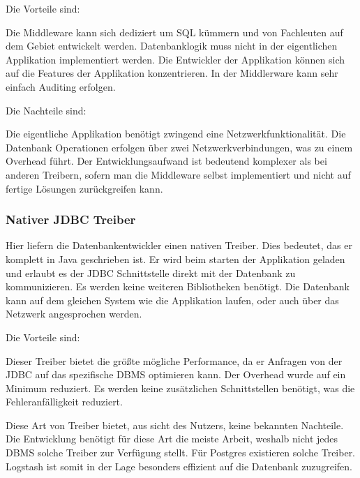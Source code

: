 Die Vorteile sind:

\begin{outline}
  \1 Die Middleware kann sich dediziert um SQL kümmern und von Fachleuten auf
  dem Gebiet entwickelt werden.
  \1 Datenbanklogik muss nicht in der eigentlichen Applikation implementiert
  werden. Die Entwickler der Applikation können sich auf die Features der
  Applikation konzentrieren.
  \1 In der Middlerware kann sehr einfach Auditing erfolgen.
\end{outline}

Die Nachteile sind:

\begin{outline}
  \1 Die eigentliche Applikation benötigt zwingend eine Netzwerkfunktionalität.
  \1 Die Datenbank Operationen erfolgen über zwei Netzwerkverbindungen, was
  zu einem Overhead führt.
  \1 Der Entwicklungsaufwand ist bedeutend komplexer als bei anderen Treibern,
  sofern man die Middleware selbst implementiert und nicht auf fertige Lösungen
  zurückgreifen kann.
\end{outline}

\subsubsection{Nativer JDBC Treiber}
Hier liefern die Datenbankentwickler einen nativen Treiber. Dies bedeutet, das
er komplett in Java geschrieben ist. Er wird beim starten der Applikation
geladen und erlaubt es der JDBC Schnittstelle direkt mit der Datenbank zu
kommunizieren. Es werden keine weiteren Bibliotheken benötigt. Die Datenbank
kann auf dem gleichen System wie die Applikation laufen, oder auch über das
Netzwerk angesprochen werden.

Die Vorteile sind:

\begin{outline}
  \1 Dieser Treiber bietet die größte mögliche Performance, da er Anfragen von
  der JDBC auf das spezifische DBMS optimieren kann.
  \1 Der Overhead wurde auf ein Minimum reduziert.
  \1 Es werden keine zusätzlichen Schnittstellen benötigt, was die
  Fehleranfälligkeit reduziert.
\end{outline}

Diese Art von Treiber bietet, aus sicht des Nutzers, keine bekannten Nachteile.
Die Entwicklung benötigt für diese Art die meiste Arbeit, weshalb nicht jedes
DBMS solche Treiber zur Verfügung stellt. Für Postgres existieren solche
Treiber. Logstash ist somit in der Lage besonders effizient auf die Datenbank
zuzugreifen.
\tm%


